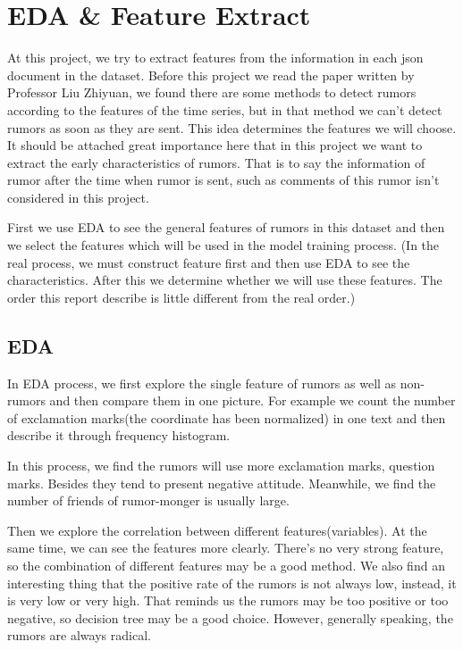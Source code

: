 \documentclass[12pt,a4paper]{article}
\begin{document}
\section{EDA \& Feature Extract}
At this project, we try to extract features from the information in each json document in the dataset. Before this project we read the paper written by Professor Liu Zhiyuan, we found there are some methods to detect rumors according to the features of the time series, but in that method we can't detect rumors as soon as they are sent. This idea determines the features we will choose. It should be attached great importance here that in this project we want to extract the early characteristics of rumors. That is to say the information of rumor after the time when rumor is sent, such as comments of this rumor isn't considered in this project.

First we use EDA to see the general features of rumors in this dataset and then we select the features which will be used in the model training process. (In the real process, we must construct feature first and then use EDA to see the characteristics. After this we determine whether we will use these features. The order this report describe is little different from the real order.)
\subsection{EDA}
In EDA process, we first explore the single feature of rumors as well as non-rumors and then compare them in one picture. For example we count the number of exclamation marks(the coordinate has been normalized) in one text and then describe it through frequency histogram.

In this process, we find the rumors will use more exclamation marks, question marks. Besides they tend to present negative attitude. Meanwhile, we find the number of friends of rumor-monger is usually large.

Then we explore the correlation between different features(variables). At the same time, we can see the features more clearly. There's no very strong feature, so the combination of different features may be a good method. We also find an interesting thing that the positive rate of the rumors is not always low, instead, it is very low or very high. That reminds us the rumors may be too positive or too negative, so decision tree may be a good choice. However, generally speaking, the rumors are always radical.
\end{document}
